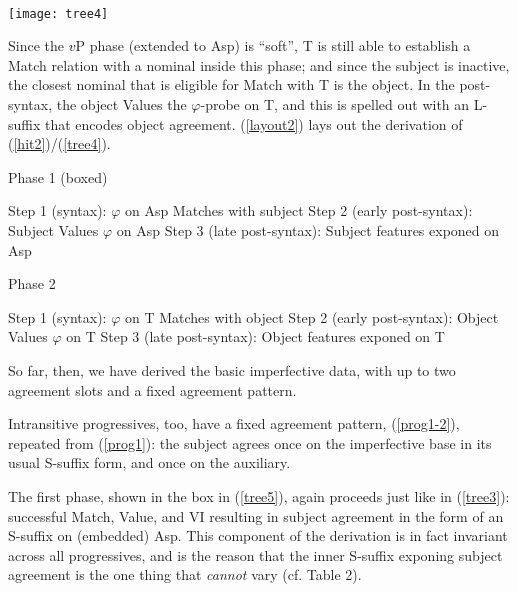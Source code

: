 \documentclass[output=paper
,modfonts
,nonflat]{langsci/langscibook}
\begin{document}
\z

\ea \label{tree4} \- \\ \texttt{[image: tree4]}
\z

\noindent Since the $v$P phase (extended to Asp) is ``soft'', T is still able to establish a Match relation with a nominal inside this phase; and since the subject is inactive, the closest nominal that is eligible for Match with T is the object. In the post-syntax, the object Values the $\varphi$-probe on T, and this is spelled out with an L-suffix that encodes object agreement. (\ref{layout2}) lays out the derivation of (\ref{hit2})/(\ref{tree4}).

\eal \label{layout2}
\ex Phase 1 (boxed)
\begin{xlist}
\ex Step 1 (syntax): $\varphi$ on Asp Matches with subject
\ex Step 2 (early post-syntax): Subject Values $\varphi$ on Asp
\ex Step 3 (late post-syntax): Subject features exponed on Asp
\end{xlist}
\ex Phase 2
\begin{xlist}
\ex Step 1 (syntax): $\varphi$ on T Matches with object
\ex Step 2 (early post-syntax): Object Values $\varphi$ on T
\ex Step 3 (late post-syntax): Object features exponed on T
\end{xlist}
\zl

\noindent So far, then, we have derived the basic imperfective data, with up to two agreement slots and a fixed agreement pattern. 

Intransitive progressives, too, have a fixed agreement pattern, (\ref{prog1-2}), repeated from (\ref{prog1}): the subject agrees once on the imperfective base in its usual S-suffix form, and once on the auxiliary. 

\z

\noindent The first phase, shown in the box in (\ref{tree5}), again proceeds just like in (\ref{tree3}): successful Match, Value, and VI resulting in subject agreement in the form of an S-suffix on (embedded) Asp. This component of the derivation is in fact invariant across all progressives, and is the reason that the inner S-suffix exponing subject agreement is the one thing that \textit{cannot} vary (cf. Table 2). 
\end{document}

